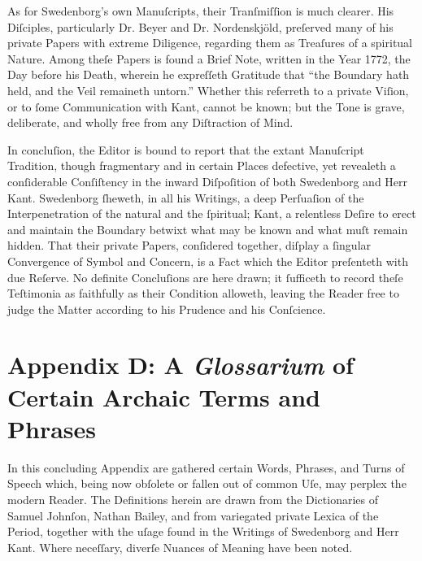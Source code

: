 \documentclass[12pt]{book}
\begin{document}
\vspace{1em}

\noindent
As for Swedenborg’s own Manuſcripts, their Tranſmiſſion is much clearer. His Diſciples, particularly Dr. Beyer and Dr. Nordenskjöld, preſerved many of his private Papers with extreme Diligence, regarding them as Treaſures of a spiritual Nature. Among theſe Papers is found a Brief Note, written in the Year 1772, the Day before his Death, wherein he expreſſeth Gratitude that “the Boundary hath held, and the Veil remaineth untorn.” Whether this referreth to a private Viſion, or to ſome Communication with Kant, cannot be known; but the Tone is grave, deliberate, and wholly free from any Diſtraction of Mind.

\vspace{1em}

\noindent
In concluſion, the Editor is bound to report that the extant Manuſcript Tradition, though fragmentary and in certain Places defective, yet revealeth a conſiderable Conſiſtency in the inward Diſpoſition of both Swedenborg and Herr Kant. Swedenborg ſheweth, in all his Writings, a deep Perſuaſion of the Interpenetration of the natural and the ſpiritual; Kant, a relentless Deſire to erect and maintain the Boundary betwixt what may be known and what muſt remain hidden. That their private Papers, conſidered together, diſplay a ſingular Convergence of Symbol and Concern, is a Fact which the Editor preſenteth with due Reſerve. No definite Concluſions are here drawn; it ſufficeth to record theſe Teſtimonia as faithfully as their Condition alloweth, leaving the Reader free to judge the Matter according to his Prudence and his Conſcience.

\vspace{1.2em}

\noindent

\newpage
\section*{Appendix D: A \textit{Glossarium} of Certain Archaic Terms and Phrases}


\noindent
In this concluding Appendix are gathered certain Words, Phrases, and Turns of Speech which, being now obſolete or fallen out of common Uſe, may perplex the modern Reader. The Definitions herein are drawn from the Dictionaries of Samuel Johnſon, Nathan Bailey, and from variegated private Lexica of the Period, together with the uſage found in the Writings of Swedenborg and Herr Kant. Where neceſſary, diverſe Nuances of Meaning have been noted.
\end{document}
